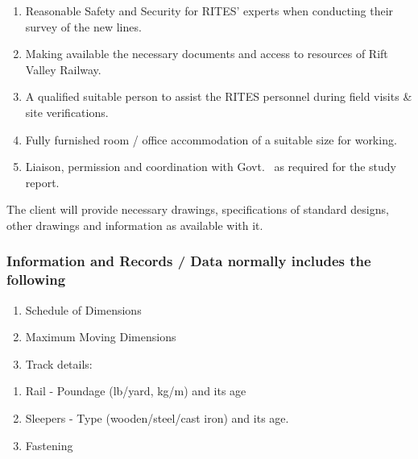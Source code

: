 \begin{enumerate}
\item Reasonable Safety and Security for RITES' experts when conducting their survey of the new lines.
\item Making available the necessary documents and access to resources of Rift Valley Railway.
\item A qualified suitable person to assist the RITES personnel during field visits \& site verifications.
\item Fully furnished room / office accommodation of a suitable size for working.
\item Liaison, permission and coordination with Govt. \ as required for the study report.
\end{enumerate}


The client will provide necessary drawings, specifications of standard designs, other drawings and information as
available with it. 

 

\subsubsection[Information and Records / Data \ normally includes the following]{Information and Records / Data  normally includes the following}
\begin{enumerate}
\item Schedule of Dimensions
\item Maximum Moving Dimensions 
\item Track details:
\end{enumerate}
\begin{enumerate}
\item  Rail - Poundage (lb/yard, kg/m) and its age
\item  Sleepers - Type (wooden/steel/cast iron) and its age. 
\item  Fastening
\end{enumerate}

